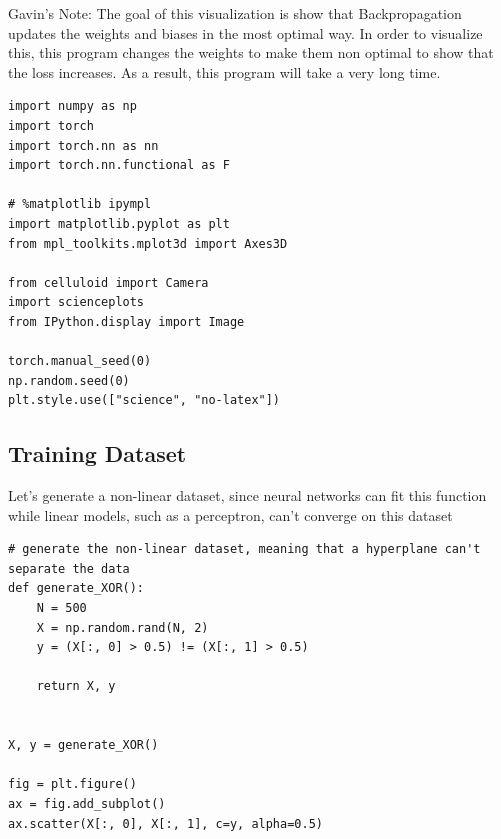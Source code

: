 \documentclass[openany]{book}
\begin{document}
    Gavin's Note: The goal of this visualization is show that
Backpropagation updates the weights and biases in the most optimal way.
In order to visualize this, this program changes the weights to make
them non optimal to show that the loss increases. As a result, this
program will take a very long time.

\begin{tcolorbox}
\tiny
\begin{verbatim}
import numpy as np
import torch
import torch.nn as nn
import torch.nn.functional as F

# %matplotlib ipympl
import matplotlib.pyplot as plt
from mpl_toolkits.mplot3d import Axes3D

from celluloid import Camera
import scienceplots
from IPython.display import Image

torch.manual_seed(0)
np.random.seed(0)
plt.style.use(["science", "no-latex"])
\end{verbatim}
\end{tcolorbox}

    \subsection{Training Dataset}\label{training-dataset}

Let's generate a non-linear dataset, since neural networks can fit this
function while linear models, such as a perceptron, can't converge on
this dataset

\begin{tcolorbox}
\tiny
\begin{verbatim}
# generate the non-linear dataset, meaning that a hyperplane can't separate the data
def generate_XOR():
    N = 500
    X = np.random.rand(N, 2)
    y = (X[:, 0] > 0.5) != (X[:, 1] > 0.5)

    return X, y


X, y = generate_XOR()

fig = plt.figure()
ax = fig.add_subplot()
ax.scatter(X[:, 0], X[:, 1], c=y, alpha=0.5)
\end{verbatim}
\end{tcolorbox}
        
\end{document}
